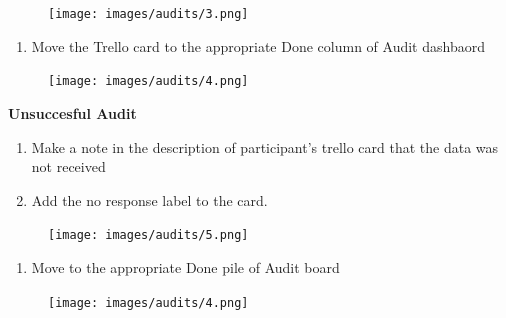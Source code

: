 \documentclass[
]{book}
\providecommand{\tightlist}{%
  \setlength{\itemsep}{0pt}\setlength{\parskip}{0pt}}
\begin{document}
\begin{figure}
\centering
\texttt{[image: images/audits/3.png]}
\caption{}
\end{figure}

\begin{enumerate}
\def\labelenumi{\arabic{enumi})}
\setcounter{enumi}{4}
\tightlist
\item
  Move the Trello card to the appropriate Done column of Audit dashbaord
\end{enumerate}

\begin{figure}
\centering
\texttt{[image: images/audits/4.png]}
\caption{}
\end{figure}

\textbf{Unsuccesful Audit}

\begin{enumerate}
\def\labelenumi{\arabic{enumi})}
\item
  Make a note in the description of participant's trello card that the data was not received
\item
  Add the no response label to the card.
\end{enumerate}

\begin{figure}
\centering
\texttt{[image: images/audits/5.png]}
\caption{}
\end{figure}

\begin{enumerate}
\def\labelenumi{\arabic{enumi})}
\setcounter{enumi}{2}
\tightlist
\item
  Move to the appropriate Done pile of Audit board
\end{enumerate}

\begin{figure}
\centering
\texttt{[image: images/audits/4.png]}
\caption{}
\end{figure}
\end{document}
